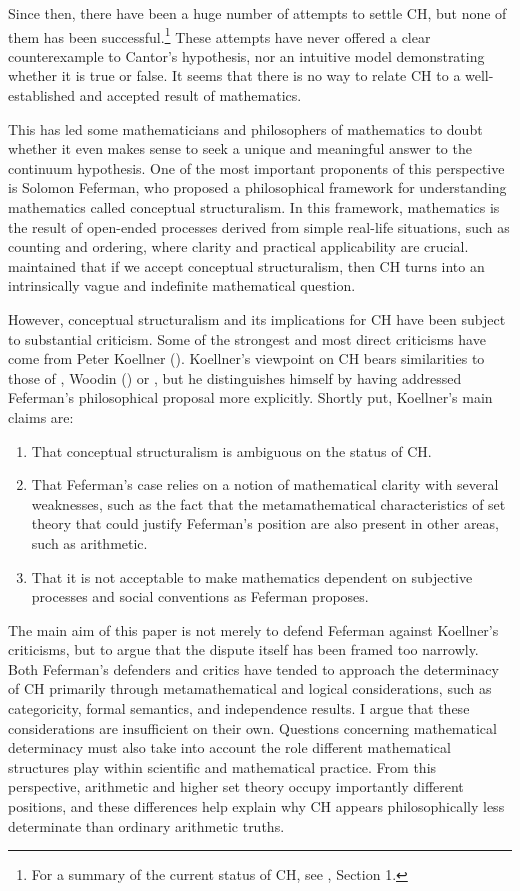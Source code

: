 \documentclass[11pt,a4paper]{article}
\theoremstyle{plain}
\begin{document}
Since then, there have been a huge number of attempts to settle CH, but none of them has been successful.\footnote{For a summary of the current status of CH, see \textcite{Feferman2011a}, Section 1. } These attempts have never offered a clear counterexample to Cantor's hypothesis, nor an intuitive model demonstrating whether it is true or false. It seems that there is no way to relate CH to a well-established and accepted result of mathematics.

This has led some mathematicians and philosophers of mathematics to doubt whether it even makes sense to seek a unique and meaningful answer to the continuum hypothesis. One of the most important proponents of this perspective is Solomon Feferman, who proposed a philosophical framework for understanding mathematics called conceptual structuralism. In this framework, mathematics is the result of open-ended processes derived from simple real-life situations, such as counting and ordering, where clarity and practical applicability are crucial. \textcite{Feferman2011a} maintained that if we accept conceptual structuralism, then CH turns into an intrinsically vague and indefinite mathematical question.

However, conceptual structuralism and its implications for CH have been subject to substantial criticism. Some of the strongest and most direct criticisms have come from Peter Koellner (\citeyear{Koellner2016,Koellner2022}). Koellner's viewpoint on CH bears similarities to those of \textcite{Parsons2016b}, Woodin (\citeyear{Woodin2001a,Woodin2001b}) or \textcite{Maddy1997}, but he distinguishes himself by having addressed Feferman's philosophical proposal more explicitly. Shortly put, Koellner's main claims are:

\begin{enumerate}
\item That conceptual structuralism is ambiguous on the status of CH.
\item That Feferman's case relies on a notion of mathematical clarity with several weaknesses, such as the fact that the metamathematical characteristics of set theory that could justify Feferman's position are also present in other areas, such as arithmetic.
\item That it is not acceptable to make mathematics dependent on subjective processes and social conventions as Feferman proposes.
\end{enumerate}

The main aim of this paper is not merely to defend Feferman against Koellner's criticisms, but to argue that the dispute itself has been framed too narrowly. Both Feferman's defenders and critics have tended to approach the determinacy of CH primarily through metamathematical and logical considerations, such as categoricity, formal semantics, and independence results. I argue that these considerations are insufficient on their own. Questions concerning mathematical determinacy must also take into account the role different mathematical structures play within scientific and mathematical practice. From this perspective, arithmetic and higher set theory occupy importantly different positions, and these differences help explain why CH appears philosophically less determinate than ordinary arithmetic truths.
\end{document}
